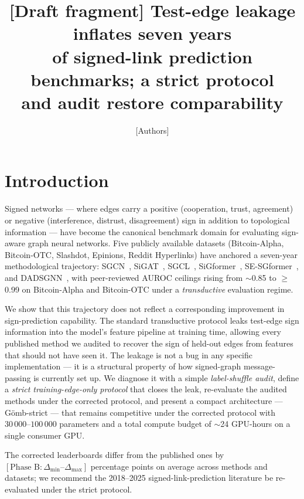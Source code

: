 \documentclass[11pt]{article}
\title{[Draft fragment] Test-edge leakage inflates seven years\\of signed-link prediction benchmarks; a strict protocol\\and audit restore comparability}
\author{[Authors]}
\date{}
\begin{document}
\maketitle

\section{Introduction}

Signed networks --- where edges carry a positive (cooperation, trust,
agreement) or negative (interference, distrust, disagreement) sign
in addition to topological information --- have become the canonical
benchmark domain for evaluating sign-aware graph neural networks.
Five publicly available datasets (Bitcoin-Alpha, Bitcoin-OTC,
Slashdot, Epinions, Reddit Hyperlinks) have anchored a seven-year
methodological trajectory: SGCN~\cite{sgcn2018}, SiGAT~\cite{sigat2019},
SGCL~\cite{sgcl2022}, SiGformer~\cite{sigformer2023},
SE-SGformer~\cite{sesgformer2024}, and DADSGNN~\cite{dadsgnn2025},
with peer-reviewed AUROC ceilings rising from $\sim$0.85 to
$\geq$0.99 on Bitcoin-Alpha and Bitcoin-OTC under a
\emph{transductive} evaluation regime.

We show that this trajectory does not reflect a corresponding
improvement in sign-prediction capability. The standard transductive
protocol leaks test-edge sign information into the model's feature
pipeline at training time, allowing every published method we audited
to recover the sign of held-out edges from features that should not
have seen it. The leakage is not a bug in any specific implementation
--- it is a structural property of how signed-graph message-passing
is currently set up. We diagnose it with a simple
\emph{label-shuffle audit}, define a \emph{strict training-edge-only
protocol} that closes the leak, re-evaluate the audited methods
under the corrected protocol, and present a compact architecture
--- Gömb-strict --- that remains competitive under the corrected
protocol with $30\,000$--$100\,000$ parameters and a total compute
budget of $\sim$24 GPU-hours on a single consumer GPU.

The corrected leaderboards differ from the published ones by
$[\text{Phase B}: \Delta_{\min}\text{--}\Delta_{\max}]$ percentage points
on average across methods and datasets; we recommend the
2018--2025 signed-link-prediction literature be re-evaluated under
the strict protocol.
\end{document}
